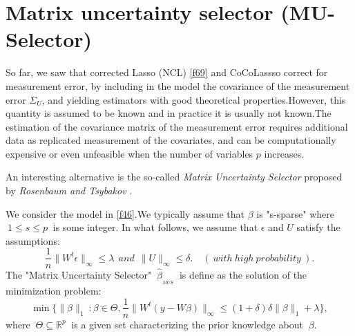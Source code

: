 \documentclass[12pt]{report}
\begin{document}
\section{Matrix uncertainty selector (MU-Selector)}
So far, we saw that corrected Lasso (NCL) \eqref{f69} and CoCoLassso correct for measurement error, by including in the model the covariance of the measurement error $\Sigma_{U}$, and yielding estimators with good theoretical properties.However, this quantity is assumed to be known and in practice it is usually not known.The estimation of the covariance matrix of the measurement error requires additional data as replicated  measurement of the covariates, and can be computationally expensive or even unfeasible when the number of variables $p$ increases.

An interesting alternative is the so-called \textit{Matrix Uncertainty Selector} proposed by \textit{Rosenbaum and Tsybakov \cite{nref23}}.

We consider the model in \eqref{f46}.We typically assume that $\beta$ is "s-sparse" where $\ 1\leq s\leq p\ $ is some integer. In what follows, we assume that $\epsilon$ and $U$ satisfy the assumptions:
\begin{equation}
	\frac{1}{n}\parallel W^{t}\epsilon\parallel_{\infty}\leq\lambda\ \ and\ \ \parallel U \parallel_{\infty}\leq \delta .\quad (\ with\ high\ probability\ ).
	\label{f82}
\end{equation}
The "Matrix Uncertainty Selector" $\ \hat{\beta}_{_{MUS}}\ $ is define as the solution of the minimization problem:
\begin{equation}
	\min\bigg\{\parallel \beta \parallel_{1}\ :\beta\in \Theta, \frac{1}{n}\parallel W^{t}(y-W\beta)\parallel_{\infty}\leq (1+\delta)\delta\parallel\beta\parallel_{1}+\lambda\bigg\},
	\label{f83}
\end{equation}
where $\ \Theta \subseteq \mathbb{R}^{p}\ $ is a given set characterizing the prior knowledge about $\ \beta$.
\end{document}
